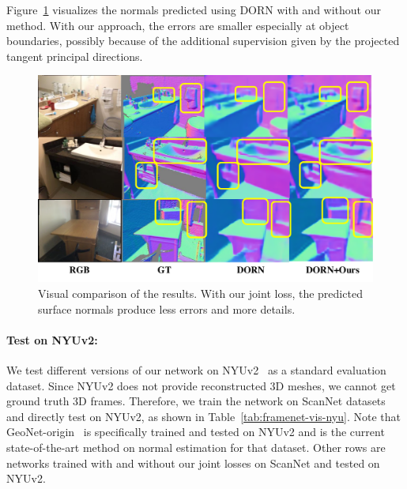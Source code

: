 Figure~\ref{fig:framenet-vis-result} visualizes the normals predicted using DORN with and without our method. With our approach, the errors are smaller especially at object boundaries, possibly because of the additional supervision given by the projected tangent principal directions.
\begin{figure}
    \centering
    \includegraphics[width=0.8\linewidth]{FrameNet/graph/norm-compare.pdf}
    \caption{Visual comparison of the results. With our joint loss, the predicted surface normals produce less errors and more details.}
    \label{fig:framenet-vis-result}
\end{figure}

\paragraph{Test on NYUv2:}
\label{sec:framenet-transfer}
We test different versions of our network on NYUv2~\cite{eigen2014depth} as a standard evaluation dataset. Since NYUv2 does not provide reconstructed 3D meshes, we cannot get ground truth 3D frames. Therefore, we train the network on ScanNet datasets and directly test on NYUv2, as shown in Table~\ref{tab:framenet-vis-nyu}. Note that GeoNet-origin~\cite{qi2018geonet} is specifically trained and tested on NYUv2 and is the current state-of-the-art method on normal estimation for that dataset. Other rows are networks trained with and without our joint losses on ScanNet and tested on NYUv2. 

